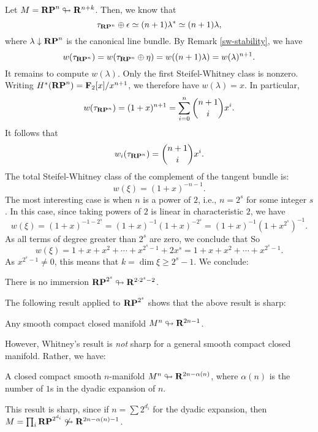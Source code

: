 \begin{example}
    Let $M = \mathbf{RP}^n\looparrowright \mathbf R^{n+k}$. Then, we know that
    $$\tau_{\mathbf{RP}^n}\oplus\epsilon\simeq (n+1)\lambda^\ast \simeq (n+1)\lambda,$$
    where $\lambda\downarrow \mathbf{RP}^n$ is the canonical line bundle. By Remark
    \ref{sw-stability}, we have
    $$w(\tau_{\mathbf{RP}^n}) = w(\tau_{\mathbf{RP}^n}\oplus\eta) = w((n+1)\lambda) =
    w(\lambda)^{n+1}.$$
    It remains to compute $w(\lambda)$. Only the first Steifel-Whitney class is
    nonzero. Writing $H^\ast(\mathbf{RP}^n) = \mathbf F_2[x]/x^{n+1}$, we therefore have
    $w(\lambda) = x$. In particular,
    $$w(\tau_{\mathbf{RP}^n}) = (1+x)^{n+1} = \sum^n_{i=0}\binom{n+1}{i}x^i.$$
    It follows that
    $$w_i(\tau_{\mathbf{RP}^n}) = \binom{n+1}{i}x^i.$$
    The total Steifel-Whitney class of the complement of the tangent bundle is:
    $$w(\xi) = (1+x)^{-n-1}.$$
    The most interesting case is when $n$ is a power of $2$, i.e., $n=2^s$ for
    some integer $s$. In this case, since taking powers of $2$ is linear in
    characteristic $2$, we have
    $$w(\xi) = (1+x)^{-1-2^s} = (1+x)^{-1}(1+x)^{-2^s} =
    (1+x)^{-1}(1+x^{2^s})^{-1}.
    $$
    As all terms of degree greater than $2^s$ are zero, we conclude that
    So
    $$w(\xi) = 1+x+x^2+\cdots+x^{2^s-1}+2x^s = 1+x+x^2+\cdots+x^{2^s-1}.$$
    As $x^{2^s-1}\neq 0$, this means that $k = \dim\xi \geq 2^s-1$. We
    conclude:
    \begin{theorem}
	There is no immersion $\mathbf{RP}^{2^s}\looparrowright \mathbf R^{2\cdot 2^{s}-2}$.
    \end{theorem}
    The following result applied to $\mathbf{RP}^{2^s}$ shows that the above result is
    sharp:
    \begin{theorem}[Whitney]
	Any smooth compact closed manifold $M^n \looparrowright \mathbf R^{2n-1}$.
    \end{theorem}
    However, Whitney's result is \emph{not} sharp for a general smooth compact
    closed manifold. Rather, we have:
    \begin{theorem}
	A closed compact smooth $n$-manifold $M^n \looparrowright
	\mathbf R^{2n-\alpha(n)}$, where $\alpha(n)$ is the number of $1$s in the
	dyadic expansion of $n$.
    \end{theorem}
    This result is sharp, since if $n=\sum 2^{d_i}$ for the dyadic expansion,
    then $M = \prod_i \mathbf{RP}^{2^{d_i}} \not \looparrowright \mathbf R^{2n-\alpha(n)-1}$.
\end{example}
